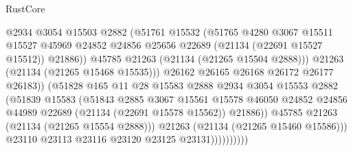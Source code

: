 \begin{lexlean}{RustCore}
\begin{coremodule}
                                  @2934
                                  @3054
                                  @15503
                                  @2882
                                  (@51761
                                    @15532
                                    (@51765
                                      @4280
                                      @3067
                                      @15511
                                      @15527
                                      @45969
                                      @24852
                                      @24856
                                      @25656
                                      @22689
                                      (@21134 (@22691 @15527 @15512))
                                      @21886))
                                  @45785
                                  @21263
                                  (@21134 (@21265 @15504 @2888)))
                                @21263
                                (@21134 (@21265 @15468 @15535)))
                              @26162
                              @26165
                              @26168
                              @26172
                              @26177
                              @26183))
                          (@51828
                            @165
                            @11
                            @28
                            @15583
                            @2888
                            @2934
                            @3054
                            @15553
                            @2882
                            (@51839
                              @15583
                              (@51843
                                @2885
                                @3067
                                @15561
                                @15578
                                @46050
                                @24852
                                @24856
                                @44989
                                @22689
                                (@21134 (@22691 @15578 @15562))
                                @21886))
                            @45785
                            @21263
                            (@21134 (@21265 @15554 @2888)))
                          @21263
                          (@21134 (@21265 @15460 @15586)))
                        @23110
                        @23113
                        @23116
                        @23120
                        @23125
                        @23131))))))))))

\end{coremodule}
\end{lexlean}
